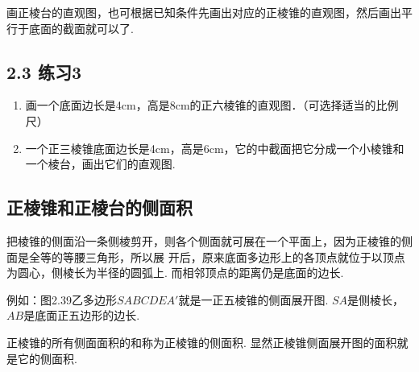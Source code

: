 \begin{rmk}
    画正棱台的直观图，也可根据已知条件先画出对应的正棱锥的直观图，然后画出平行于底面的截面就可以了.
\end{rmk}


\subsection*{2.3 练习3}
\begin{enumerate}
\item 画一个底面边长是4cm，高是8cm的正六棱锥的直观图．（可选择适当的比例尺）
\item 一个正三棱锥底面边长是4cm，高是6cm，它的中截面把它分成一个小棱锥和一个棱台，画出它们的直观图.
\end{enumerate}

\subsection{正棱锥和正棱台的侧面积}
把棱锥的侧面沿一条侧棱剪开，则各个侧面就可展在一个平面上，因为正棱锥的侧面是全等的等腰三角形，所以展
开后，原来底面多边形上的各顶点就位于以顶点为圆心，侧棱长为半径的圆弧上. 而相邻顶点的距离仍是底面的边长.

例如：图2.39乙多边形$SABCDEA'$就是一正五棱锥的侧面展开图. $SA$是侧棱长，$AB$是底面正五边形的边长.

正棱锥的所有侧面面积的和称为正棱锥的侧面积. 显然正棱锥侧面展开图的面积就是它的侧面积.

\begin{figure}[htp]
    \centering
{}
    \caption{}
\end{figure}

